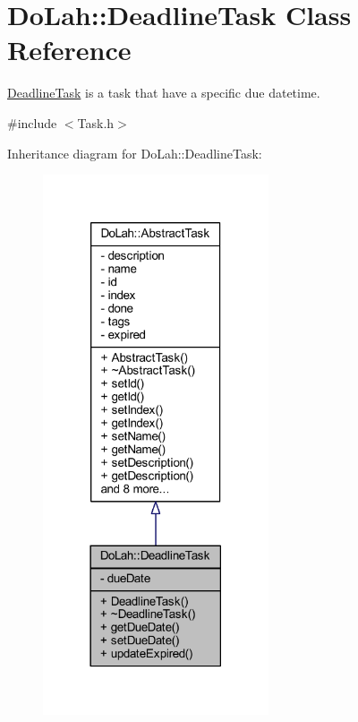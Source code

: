 \hypertarget{class_do_lah_1_1_deadline_task}{}\section{Do\+Lah\+:\+:Deadline\+Task Class Reference}
\label{class_do_lah_1_1_deadline_task}


\hyperlink{class_do_lah_1_1_deadline_task}{Deadline\+Task} is a task that have a specific due datetime.  




{\ttfamily \#include $<$Task.\+h$>$}



Inheritance diagram for Do\+Lah\+:\+:Deadline\+Task\+:\nopagebreak
\begin{figure}[H]
\begin{center}
\leavevmode
\includegraphics[width=189pt]{class_do_lah_1_1_deadline_task__inherit__graph}
\end{center}
\end{figure}


